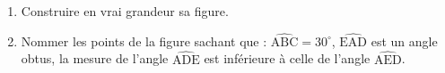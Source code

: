 \documentclass[exercice]{thedocument}%
\begin{document}
%
\begin{enumerate}
    \item Construire en vrai grandeur sa figure.
    \item Nommer les points de la figure sachant que :
    $\widehat{\text{ABC}}=30^\circ$, $\widehat{\text{EAD}}$ est un angle obtus,
    la mesure de l'angle $\widehat{\text{ADE}}$ est inférieure à celle de
    l'angle $\widehat{\text{AED}}$.
\end{enumerate}
\end{document}
